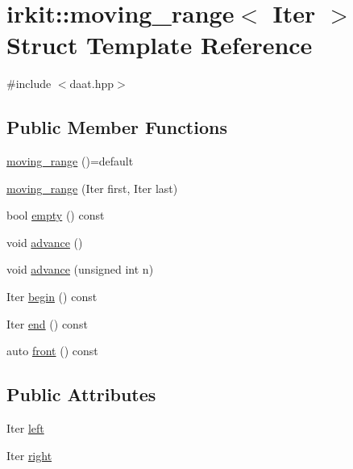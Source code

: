 \hypertarget{structirkit_1_1moving__range}{}\section{irkit\+:\+:moving\+\_\+range$<$ Iter $>$ Struct Template Reference}
\label{structirkit_1_1moving__range}


{\ttfamily \#include $<$daat.\+hpp$>$}

\subsection*{Public Member Functions}
\begin{DoxyCompactItemize}
\item 
\mbox{\hyperlink{structirkit_1_1moving__range_a9b6d474c670875034ca5a044b0a2fc14}{moving\+\_\+range}} ()=default
\item 
\mbox{\hyperlink{structirkit_1_1moving__range_a79a261cc6e7da7ffb0d93a198fe3dab7}{moving\+\_\+range}} (Iter first, Iter last)
\item 
bool \mbox{\hyperlink{structirkit_1_1moving__range_a8d4e48c5d31fbc158da77eec0c90010e}{empty}} () const
\item 
void \mbox{\hyperlink{structirkit_1_1moving__range_a5ee65e31d2983395c02b724ede47c034}{advance}} ()
\item 
void \mbox{\hyperlink{structirkit_1_1moving__range_a792efd70f3efcb651bff438a0e0814ce}{advance}} (unsigned int n)
\item 
Iter \mbox{\hyperlink{structirkit_1_1moving__range_af58c3dbe1e87c3222ee4a80aa745d9a1}{begin}} () const
\item 
Iter \mbox{\hyperlink{structirkit_1_1moving__range_a5e5ff06f38d6cdba4735e7dd632759ef}{end}} () const
\item 
auto \mbox{\hyperlink{structirkit_1_1moving__range_ad9b6b752c32f19fdbfe2dfa607ea4fc3}{front}} () const
\end{DoxyCompactItemize}
\subsection*{Public Attributes}
\begin{DoxyCompactItemize}
\item 
Iter \mbox{\hyperlink{structirkit_1_1moving__range_a175a0bc6996715ea27e6b87abff03139}{left}}
\item 
Iter \mbox{\hyperlink{structirkit_1_1moving__range_aa64b16b98bdd7b627ecceb82c8ef3bec}{right}}
\end{DoxyCompactItemize}


